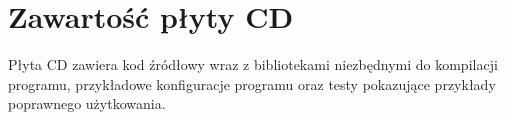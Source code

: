 \chapter{Zawartość płyty CD}
\thispagestyle{chapterBeginStyle}
\label{plytaCD}

Płyta CD zawiera kod źródłowy wraz z bibliotekami niezbędnymi do kompilacji programu, przykładowe konfiguracje programu oraz testy pokazujące przykłady poprawnego użytkowania.


